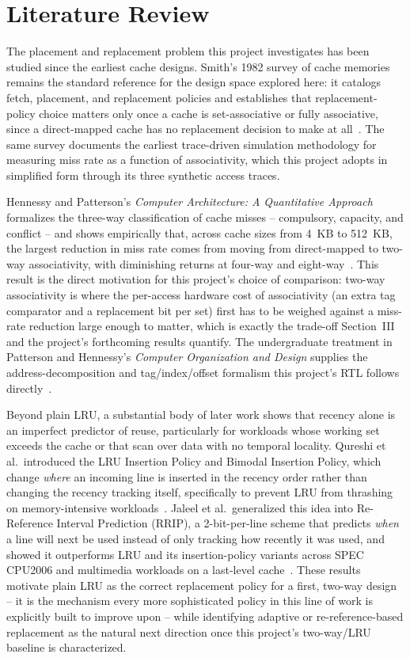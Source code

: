 \documentclass[conference]{IEEEtran}
\begin{document}
\section{Literature Review}
The placement and replacement problem this project investigates has been studied since the earliest cache designs. Smith's 1982 survey of cache memories remains the standard reference for the design space explored here: it catalogs fetch, placement, and replacement policies and establishes that replacement-policy choice matters only once a cache is set-associative or fully associative, since a direct-mapped cache has no replacement decision to make at all~\cite{smith1982}. The same survey documents the earliest trace-driven simulation methodology for measuring miss rate as a function of associativity, which this project adopts in simplified form through its three synthetic access traces.

Hennessy and Patterson's \emph{Computer Architecture: A Quantitative Approach} formalizes the three-way classification of cache misses -- compulsory, capacity, and conflict -- and shows empirically that, across cache sizes from 4~KB to 512~KB, the largest reduction in miss rate comes from moving from direct-mapped to two-way associativity, with diminishing returns at four-way and eight-way~\cite{hennessy2017}. This result is the direct motivation for this project's choice of comparison: two-way associativity is where the per-access hardware cost of associativity (an extra tag comparator and a replacement bit per set) first has to be weighed against a miss-rate reduction large enough to matter, which is exactly the trade-off Section~III and the project's forthcoming results quantify. The undergraduate treatment in Patterson and Hennessy's \emph{Computer Organization and Design} supplies the address-decomposition and tag/index/offset formalism this project's RTL follows directly~\cite{patterson2011}.

Beyond plain LRU, a substantial body of later work shows that recency alone is an imperfect predictor of reuse, particularly for workloads whose working set exceeds the cache or that scan over data with no temporal locality. Qureshi et al.\ introduced the LRU Insertion Policy and Bimodal Insertion Policy, which change \emph{where} an incoming line is inserted in the recency order rather than changing the recency tracking itself, specifically to prevent LRU from thrashing on memory-intensive workloads~\cite{qureshi2007}. Jaleel et al.\ generalized this idea into Re-Reference Interval Prediction (RRIP), a 2-bit-per-line scheme that predicts \emph{when} a line will next be used instead of only tracking how recently it was used, and showed it outperforms LRU and its insertion-policy variants across SPEC CPU2006 and multimedia workloads on a last-level cache~\cite{jaleel2010}. These results motivate plain LRU as the correct replacement policy for a first, two-way design -- it is the mechanism every more sophisticated policy in this line of work is explicitly built to improve upon -- while identifying adaptive or re-reference-based replacement as the natural next direction once this project's two-way/LRU baseline is characterized.
\end{document}
